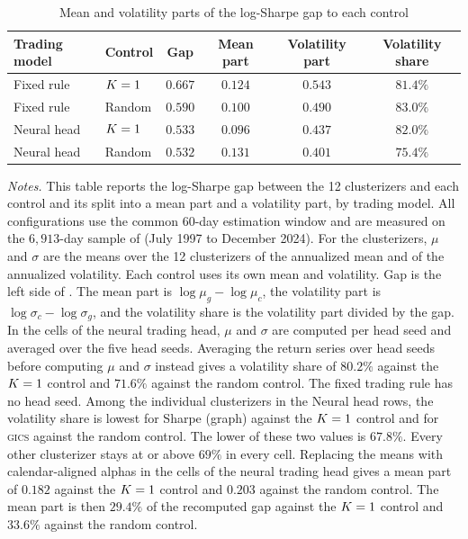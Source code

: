 \begin{table}[tb]
\centering
\caption{Mean and volatility parts of the log-Sharpe gap to each control}
\label{tab:split}
\begin{threeparttable}
\small
\begin{tabular}{@{}llcccc@{}}
\toprule
Trading model & Control & Gap & Mean part & Volatility part & Volatility share \\
\midrule
Fixed rule & $K=1$  & $0.667$ & $0.124$ & $0.543$ & $81.4\%$ \\
Fixed rule & Random  & $0.590$ & $0.100$ & $0.490$ & $83.0\%$ \\
Neural head & $K=1$ & $0.533$ & $0.096$ & $0.437$ & $82.0\%$ \\
Neural head & Random & $0.532$ & $0.131$ & $0.401$ & $75.4\%$ \\
\bottomrule
\end{tabular}
\begin{tablenotes}[flushleft]\footnotesize
\item \emph{Notes.} This table reports the log-Sharpe gap between the 12 clusterizers and each control and its split into a mean part and a volatility part, by trading model. All configurations use the common 60-day estimation window and are measured on the $6{,}913$-day sample of  (July 1997 to December 2024). For the clusterizers, $\mu$ and $\sigma$ are the means over the 12 clusterizers of the annualized mean and of the annualized volatility. Each control uses its own mean and volatility. Gap is the left side of . The mean part is $\log\mu_g-\log\mu_c$, the volatility part is $\log\sigma_c-\log\sigma_g$, and the volatility share is the volatility part divided by the gap. In the cells of the neural trading head, $\mu$ and $\sigma$ are computed per head seed and averaged over the five head seeds. Averaging the return series over head seeds before computing $\mu$ and $\sigma$ instead gives a volatility share of $80.2\%$ against the $K=1$ control and $71.6\%$ against the random control. The fixed trading rule has no head seed. Among the individual clusterizers in the Neural head rows, the volatility share is lowest for Sharpe (graph) against the $K=1$ control and for \textsc{gics} against the random control. The lower of these two values is $67.8\%$. Every other clusterizer stays at or above $69\%$ in every cell. Replacing the means with calendar-aligned alphas in the cells of the neural trading head gives a mean part of $0.182$ against the $K=1$ control and $0.203$ against the random control. The mean part is then $29.4\%$ of the recomputed gap against the $K=1$ control and $33.6\%$ against the random control.
\end{tablenotes}
\end{threeparttable}
\end{table}

